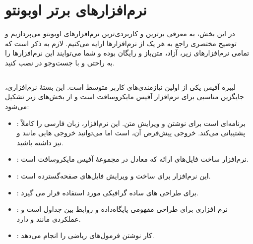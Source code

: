 \chapter{نرم‌افزارهای برتر اوبونتو}
در این بخش، به معرفی برترین و کاربردی‌ترین نرم‌افزارهای اوبونتو می‌پردازیم و توضیح مختصری راجع به هر یک از نرم‌افزارها ارایه می‌کنیم. لازم به ذکر است که تمامی نرم‌افزارهای زیر، آزاد، متن‌باز و رایگان بوده و شما می‌توایند این نرم‌افزارها را به راحتی و با جست‌و‌جو در  نصب کنید.

\section[libreOffice]{}
لیبره آفیس یکی از اولین نیازمندی‌های کاربر متوسط است. این بستهٔ نرم‌افزاری، جایگزین مناسبی برای نرم‌افزار آفیس مایکروسافت است و از بخش‌های زیر تشکیل می‌شود:
\begin{itemize}
\item {}: برنامه‌ای است برای نوشتن و ویرایش متن. این نرم‌افزار، زبان فارسی را کاملاً پشتیبانی می‌کند. خروجی پیش‌فرض آن،  است اما می‌توانید خروجی هایی مانند  و  نیز داشته باشید.
\item {}: نرم‌افزار ساخت فایل‌های ارائه که معادل  در مجموعهٔ آفیس مایکروسافت است.
\item {}: این نرم‌افزار برای ساخت و ویرایش فایل‌های صفحه‌گسترده است.
\item {}: برای طراحی های ساده گرافیکی مورد استفاده قرار می گیرد.
\item {}: نرم افزاری برای طراحی مفهومی پایگاه‌داده و روابط بین جداول است و عملکردی مانند  و  دارد.
\item {}: کار نوشتن فرمول‌های ریاضی را انجام می‌دهد.
\end{itemize}


